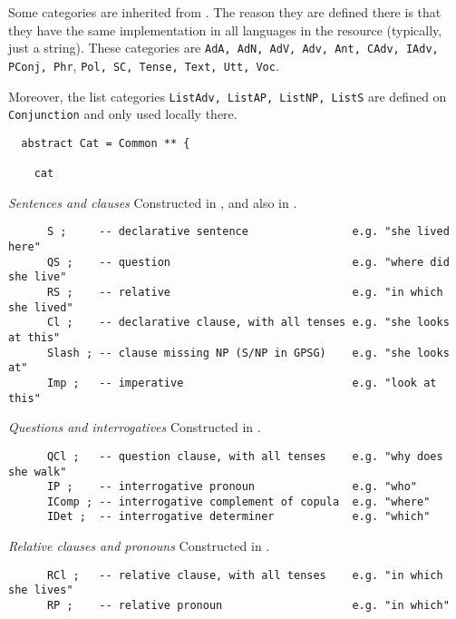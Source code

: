 \documentclass[11pt,a4paper]{article}
\newcommand{\subsubsubsection}[1]{\textit{#1}}
\begin{document}
Some categories are inherited from .
The reason they are defined there is that they have the same
implementation in all languages in the resource (typically,
just a string). These categories are
\texttt{AdA, AdN, AdV, Adv, Ant, CAdv, IAdv, PConj, Phr}, 
\texttt{Pol, SC, Tense, Text, Utt, Voc}.

Moreover, the list categories \texttt{ListAdv, ListAP, ListNP, ListS}
are defined on \texttt{Conjunction} and only used locally there.

\begin{verbatim}
  abstract Cat = Common ** {
  
    cat
\end{verbatim}

\subsubsubsection{Sentences and clauses}
Constructed in , and also in
.

\begin{verbatim}
      S ;     -- declarative sentence                e.g. "she lived here"
      QS ;    -- question                            e.g. "where did she live"
      RS ;    -- relative                            e.g. "in which she lived"
      Cl ;    -- declarative clause, with all tenses e.g. "she looks at this"
      Slash ; -- clause missing NP (S/NP in GPSG)    e.g. "she looks at"
      Imp ;   -- imperative                          e.g. "look at this"
\end{verbatim}

\subsubsubsection{Questions and interrogatives}
Constructed in .

\begin{verbatim}
      QCl ;   -- question clause, with all tenses    e.g. "why does she walk"
      IP ;    -- interrogative pronoun               e.g. "who"
      IComp ; -- interrogative complement of copula  e.g. "where"
      IDet ;  -- interrogative determiner            e.g. "which"
\end{verbatim}

\subsubsubsection{Relative clauses and pronouns}
Constructed in .

\begin{verbatim}
      RCl ;   -- relative clause, with all tenses    e.g. "in which she lives"
      RP ;    -- relative pronoun                    e.g. "in which"
\end{verbatim}
\end{document}
